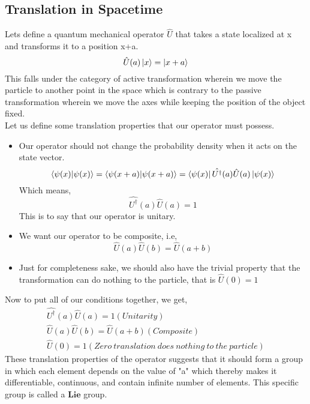 \subsection{Translation in Spacetime}
Lets define a quantum mechanical operator $\hat{U}$ that takes a state localized at x and transforms it to a position x+a.
\begin{equation}
    \hat{U}(a) \ket{x} = \ket{x+a}
\end{equation}
This falls under the category of active transformation wherein we move the particle to another point in the space which is contrary to the passive transformation wherein we move the axes while keeping the position of the object fixed. \\ 
Let us define some translation properties that our operator must possess. 
\begin{itemize}
    \item Our operator should not change the probability density when it acts on the state vector. 
    \begin{equation}
        \braket{\psi(x)} = \braket{\psi(x+a)} = \bra{\psi(x)}\hat{U^{\dagger}}(a) \hat{U}(a) \ket{\psi(x)}
    \end{equation}
    Which means, 
    \begin{equation}
        \hat{U^{\dagger}}(a)\hat{U}(a) = 1
    \end{equation}
    This is to say that our operator is unitary. 
    \item We want our operator to be composite, i.e, 
    \begin{equation}
        \hat{U}(a) \hat{U}(b) = \hat{U}(a+b)
    \end{equation}
    \item Just for completeness sake, we should also have the trivial property that the transformation can do nothing to the particle, that is $\hat{U}(0)= 1$
\end{itemize}
Now to put all of our conditions together, we get, 
\begin{eqnarray}
 \hat{U^{\dagger}}(a)\hat{U}(a) = 1 (Unitarity)\\
  \hat{U}(a) \hat{U}(b) = \hat{U}(a+b)(Composite) \\
  \hat{U}(0)= 1(Zero \: translation \: does \: nothing \: to \: the \: particle)
\end{eqnarray}
These translation properties of the operator suggests that it should form a group in which each element depends on the value of "a" which thereby makes it differentiable, continuous, and contain infinite number of elements. This specific group is called a $\boldsymbol{Lie}$ group. \\

